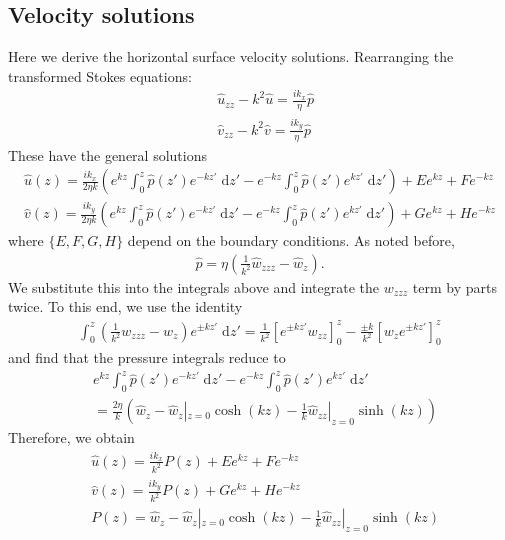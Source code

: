 \documentclass[paper=a4, fontsize=11pt]{article}
\begin{document}
\subsection*{Velocity solutions}
Here we derive the horizontal surface velocity solutions.
Rearranging the transformed Stokes equations:
\begin{align}
  &  \widehat{u}_{zz}-k^2\widehat{u} = \frac{ik_x}{\eta}\widehat{p} \\
  &  \widehat{v}_{zz}-k^2\widehat{v} = \frac{ik_y}{\eta}\widehat{p}
\end{align}
These have the general solutions
\begin{align}
\widehat{u}(z) = \frac{ik_x }{2\eta k} \left(e^{kz}\int_0^z \widehat{p}(z')e^{-kz'}\;\mathrm{d}z' -
e^{-kz}\int_0^z \widehat{p}(z')e^{kz'}\;\mathrm{d}z'\right)
+ E e^{kz} + F e^{-kz} \\
\widehat{v}(z) = \frac{ik_y }{2\eta k} \left(e^{kz}\int_0^z \widehat{p}(z')e^{-kz'}\;\mathrm{d}z' -
e^{-kz}\int_0^z \widehat{p}(z')e^{kz'}\;\mathrm{d}z'\right)
+ G e^{kz} + H e^{-kz}
\end{align}
where $\{E,F,G,H\}$ depend on the boundary conditions.
As noted before,
\begin{align}
\widehat{p} = \eta\left(\frac{1}{k^2}\widehat{w}_{zzz}-\widehat{w}_z \right).
\end{align}
We substitute this into the integrals above
and integrate the $w_{zzz}$ term by parts twice.
To this end, we use the identity
\begin{align}
\int_0^z \left( \frac{1}{k^2} w_{zzz} - w_{z}\right) e^{\pm kz'}\;\mathrm{d}z'
= \frac{1}{k^2} \left[e^{\pm kz'}w_{zz}\right]_0^z - \frac{\pm k}{k^2}\left[w_ze^{\pm kz'} \right]_0^z
\end{align}
and find that the pressure integrals reduce to
\begin{align}
&e^{kz}\int_0^z \widehat{p}(z')e^{-kz'}\;\mathrm{d}z' -
  e^{-kz}\int_0^z \widehat{p}(z')e^{kz'}\;\mathrm{d}z' \nonumber
  \\ &= \frac{2\eta}{k} \left( \widehat{w}_z-\widehat{w}_z|_{z=0}\cosh(kz) - \frac{1}{k} \widehat{w}_{zz}|_{z=0}\sinh(kz)  \right)
\end{align}
Therefore, we obtain
\begin{align}
&\widehat{u}(z) = \frac{ik_x }{k^2} P(z)
+ E e^{kz} + F e^{-kz} \\
&\widehat{v}(z) = \frac{ik_y }{k^2} P(z) + G e^{kz} + H e^{-kz} \\
&P(z) = \widehat{w}_z-\widehat{w}_z|_{z=0}\cosh(kz) - \frac{1}{k} \widehat{w}_{zz}|_{z=0}\sinh(kz)
\end{align}
\end{document}
